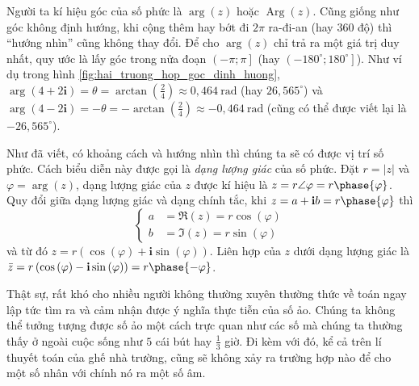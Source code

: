 \documentclass[a4paper, titlepage, openany]{book}
\DeclareMathOperator{\Arg}{Arg}
\newcommand\dblquote[1]{\textquotedblleft #1\textquotedblright}
\numberwithin{equation}{chapter}
\begin{document}
Người ta kí hiệu góc của số phức là $\arg{(z)}$ hoặc $\Arg{(z)}$. Cũng giống như góc không định hướng, khi cộng thêm hay bớt đi $2\pi$ ra-đi-an (hay $360$ độ) thì \dblquote{hướng nhìn} cũng không thay đổi. Để cho $\arg{(z)}$ chỉ trả ra một giá trị duy nhất, quy ước là lấy góc trong nửa đoạn $\left(-\pi;\pi\right]$ (hay $\left(-180^\circ;180^\circ\right]$). Như ví dụ trong hình \ref{fig:hai_truong_hop_goc_dinh_huong}, $\arg{(4+2\mathbf{i})} = \theta = \arctan\left(\frac{2}{4}\right) \approx 0,464~\text{rad}$ (hay $26,565^\circ$) và $\arg{(4-2\mathbf{i})} = -\theta = -\arctan\left(\frac{2}{4}\right) \approx -0,464~\text{rad}$ (cũng có thể được viết lại là $-26,565^\circ$).

Như đã viết, có khoảng cách và hướng nhìn thì chúng ta sẽ có được vị trí số phức. Cách biểu diễn này được gọi là \emph{dạng lượng giác} của số phức. Đặt $r = |z|$ và $\varphi = \arg{(z)}$, dạng lượng giác của $z$ được kí hiệu là $z = r \angle \varphi = r \phase{\varphi}$. Quy đổi giữa dạng lượng giác và dạng chính tắc, khi $z = a + \mathbf{i}b = r \phase{\varphi}$ thì
\[
\left\{
\begin{aligned}
   a &= \Re{(z)} = r \cos{(\varphi)} \\ 
   b &= \Im{(z)} = r \sin{(\varphi)}
\end{aligned}
\right.
\]
và từ đó $z = r\left(\cos{(\varphi)} + \mathbf{i}\sin{(\varphi)}\right)$. Liên hợp của $z$ dưới dạng lượng giác là $\bar{z} = r\left(\cos{(\varphi)} - \mathbf{i}\sin{(\varphi)}\right) = r \phase{-\varphi}$.



Thật sự, rất khó cho nhiều người không thường xuyên thường thức về toán ngay lập tức tìm ra và cảm nhận được ý nghĩa thực tiễn của số ảo. Chúng ta không thể tưởng tượng được số ảo một cách trực quan như các số mà chúng ta thường thấy ở ngoài cuộc sống như $5$ cái bút hay $\frac{1}{3}$ giờ. Đi kèm với đó, kể cả trên lí thuyết toán của ghế nhà trường, cũng sẽ không xảy ra trường hợp nào để cho một số nhân với chính nó ra một số âm. 
\end{document}
